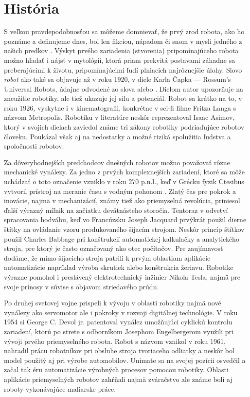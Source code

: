 \section{História}
S veľkou pravdepodobnosťou sa môžeme domnievať, že prvý zrod robota, ako ho poznáme a definujeme dnes, bol len fikciou, nápadom či snom v mysli jedného z našich predkov \cite{RoboticsAndAutomationHandbook}. Výskyt prvého zariadenia (stvorenia) pripomínajúceho robota možno hľadať i nájsť v mytológií, ktorá priam prekvitá postavami záhadne sa preberajúcimi k životu, pripomínajúcimi ľudí plniacich najrôznejšie úlohy. Slovo \textit{robot} ako také sa objavuje až v roku 1920, v diele Karla Čapka --- Rossum's Universal Robots, údajne odvodené zo slova  alebo . Dielom autor upozorňuje na zneužitie robotiky, ale tiež ukazuje jej silu a potenciál. Robot sa krátko na to, v roku 1926, vyskytne i v kinematografii, konkrétne v sci-fi filme Fritza Langa s názvom Metropolis. Robotiku v literatúre neskôr reprezentoval Isaac Asimov, ktorý v svojich dielach zaviedol známe tri zákony robotiky podriaďujúce robotov človeku. Poukázal však aj na nedostatky a možné riziká spolužitia ľudstva a spoločnosti robotov.

Za dôveryhodnejších predchodcov dnešných robotov možno považovať rôzne mechanické vynálezy. Za jedno z prvých komplexnejších zariadení, ktoré sa môže uchádzať o toto označenie vzniklo v roku 270 p.n.l., keď v Grécku fyzik Ctesibus vytvoril prístroj na meranie času s vodným pohonom \cite{RoboticsAndAutomationHandbook}. Zlatý čas pre pokrok a inovácie, najmä v mechanizácií, známy tiež ako priemyselná revolúcia, priniesol ďalší výrazný míľnik na začiatku devätnásteho storočia. Tentoraz v odvetví spracovania hodvábu, keď vo Francúzsku Joseph Jacquard prvýkrát použil dierne štítky na ovládanie vzoru produkovaného šijacím strojom. Neskôr princíp štítkov použil Charles Babbage pri konštrukcií automatickej kalkulačky a analytického stroja, pre ktorý je často označovaný ako otec počítačov. Pre zaujímavosť dodáme, že mimo šijacieho stroja patrili k prvým oblastiam aplikácie automatizácie napríklad výroba skrutiek alebo konštrukcia žeriavu. Robotike výrazne pomohol i preslávený elektrotechnický inžinier Nikola Tesla, najmä pre svoje prínosy v súvise s objavom striedavého prúdu.

Po druhej svetovej vojne prispeli k vývoju v oblasti robotiky najmä nové vynálezy ako servomotor ale i pokroky v rozvoji digitálnej technológie. V roku 1954 si George C. Devol jr. patentoval vynález umožňujúci cyklickú kontrolu zariadení, ktorú po strete s odborníkom Josephom Engelbergerom využili pri vývoji prvého priemyselného robota. Robot s názvom  vznikol v roku 1961, nahradil prácu robotníkov pri obsluhe stroja tvoriaceho odliatky a neskôr bol model použitý aj pri výrobe automobilov. Unimate sa na svojej pozícii osvedčil a začal tak éru automatizácie výrobných procesov pomocou robotiky. Oblasti aplikácie priemyselných robotov zahŕňali najmä zváračstvo ale známe boli aj roboty vykonávajúce maliarske práce.

